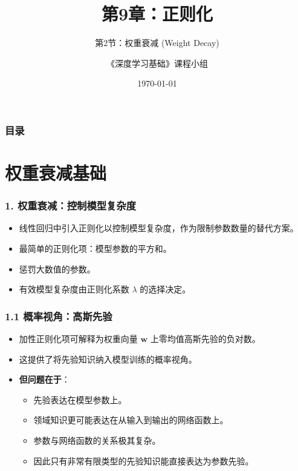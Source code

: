 \documentclass[t,aspectratio=169]{beamer} %
\title[9.2.权重衰减]{第9章：正则化}
\subtitle{第2节：权重衰减 (Weight Decay)}
\author{《深度学习基础》课程小组}
\date{\today}
\begin{document}
\frame{\titlepage}

\begin{frame}
    \frametitle{目录}
    \tableofcontents
\end{frame}

\section{权重衰减基础}

\begin{frame}
    \frametitle{1. 权重衰减：控制模型复杂度}
    \begin{itemize}
        \item 线性回归中引入正则化以\alert{控制模型复杂度}，作为限制参数数量的替代方案。
        \item 最简单的正则化项：\alert{模型参数的平方和}。
        \item 惩罚大数值的参数。
        \item 有效模型复杂度由\alert{正则化系数 $\lambda$} 的选择决定。
    \end{itemize}
\end{frame}

\begin{frame}
    \frametitle{1.1 概率视角：高斯先验}
    \begin{itemize}
        \item 加性正则化项可解释为\alert{权重向量 $\mathbf{w}$ 上零均值高斯先验}的负对数。
        \item 这提供了将先验知识纳入模型训练的\alert{概率视角}。
        \item \textbf{但问题在于}：
        \begin{itemize}
            \item 先验表达在\alert{模型参数}上。
            \item 领域知识更可能表达在\alert{从输入到输出的网络函数}上。
            \item 参数与网络函数的关系\alert{极其复杂}。
            \item 因此只有非常有限类型的先验知识能直接表达为参数先验。
        \end{itemize}
    \end{itemize}
\end{frame}
\end{document}

